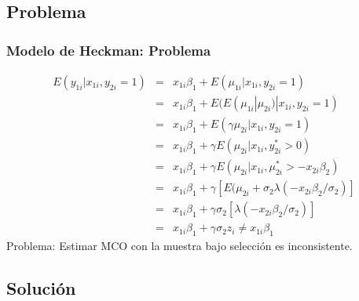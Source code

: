 \subsection{Problema}

\begin{frame}[fragile]
	\frametitle{Modelo de Heckman: Problema}
	
	
	\begin{eqnarray}
		E(y_{1i}|x_{1i},y_{2i}=1) &=& x_{1i}\beta_1+E(\mu_{1i}|x_{1i},y_{2i}=1)  \\
		&=& x_{1i}\beta_1+E( E(\mu_{1i} | \mu_{2i})| x_{1i},y_{2i}=1) \\
		&=& x_{1i}\beta_1+E( \gamma \mu_{2i} | x_{1i},y_{2i}=1) \\
		&=& x_{1i}\beta_1+ \gamma E( \mu_{2i} | x_{1i},y_{2i}^*>0) \\
		&=& x_{1i}\beta_1+ \gamma E( \mu_{2i} | x_{1i},\mu_{2i}^*>-x_{2i}\beta_2) \\
		&=& x_{1i}\beta_1+ \gamma [E( \mu_{2i}  + \sigma_2 \lambda(-x_{2i}\beta_2/\sigma_2)] 	 \\
		&=& x_{1i}\beta_1+ \gamma  \sigma_2 [ \lambda(-x_{2i}\beta_2/\sigma_2)] 	\\ 
		&=& x_{1i}\beta_1+ \gamma  \sigma_2 z_i \not=x_{1i}\beta_1 	 
	\end{eqnarray}
	Problema: Estimar  MCO con la muestra bajo selección es inconsistente.
\end{frame}

\subsection{Solución}

